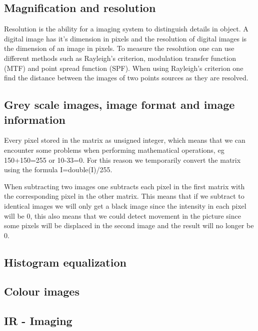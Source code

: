 \subsection{Magnification and resolution}
Resolution is the ability for a imaging system to distinguish details in object. A digital image has it's dimension in pixels and the resolution of digital images is the dimension of an image in pixels. To measure the resolution one can use different methods such as Rayleigh's criterion, modulation transfer function (MTF) and point spread function (SPF). 
When using Rayleigh's criterion one find the distance between the images of two points sources as they are resolved.
% 

\subsection{Grey scale images, image format and image information}
Every pixel stored in the matrix as unsigned integer, which means that we can encounter some problems when performing mathematical operations, eg 150+150=255 or 10-33=0. For this reason we temporarily convert the matrix using the formula I=double(I)/255. 

When subtracting two images one subtracts each pixel in the first matrix with the corresponding pixel in the other matrix. %
This means that if we subtract to identical images we will only get a black image since the intensity in each pixel will be 0, this also means that we could detect movement in the picture since some pixels will be displaced in the second image and the result will no longer be 0.
\subsection{Histogram equalization}

\subsection{Colour images}


\subsection{IR - Imaging}